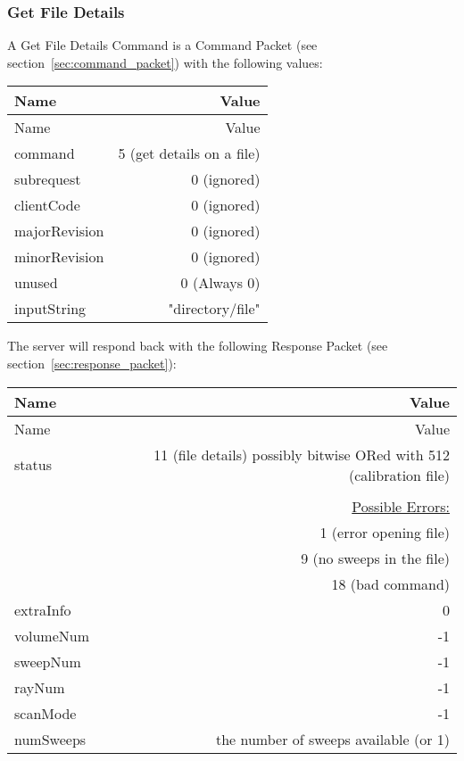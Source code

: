 \documentclass[10pt]{article}
\newcommand{\tblspc}{\rule{0pt}{3ex}}
\begin{document}
\subsubsection{Get File Details}
\label{sec:get_file_details}
A Get File Details Command is a Command Packet (see section~\ref{sec:command_packet}) with the following values:
\begin{longtable}{|l|r|}
\hline Name & Value \\ \hline \endfirsthead
\hline Name & Value \\ \hline \endhead
\hline \endfoot
\tblspc command & 5 (get details on a file) \\
\hline
\tblspc subrequest & 0 (ignored) \\
\hline
\tblspc clientCode & 0 (ignored) \\
\hline
\tblspc majorRevision & 0 (ignored) \\
\hline
\tblspc minorRevision & 0 (ignored) \\
\hline
\tblspc unused & 0 (Always 0) \\
\hline
\tblspc inputString & "directory/file" \\
\hline
\end{longtable}
\newpage

The server will respond back with the following Response Packet (see section~\ref{sec:response_packet}):
\begin{longtable}{|l|r|}
\hline Name & Value \\ \hline \endfirsthead
\hline Name & Value \\ \hline \endhead
\hline \endfoot
\tblspc status & 11 (file details) possibly bitwise ORed with 512 (calibration file) \\
& \\
& \underline{Possible Errors:} \\
& 1 (error opening file) \\
& 9 (no sweeps in the file) \\
& 18 (bad command) \\
\hline
\tblspc extraInfo & 0 \\
\hline
\tblspc volumeNum & -1 \\
\hline
\tblspc sweepNum & -1 \\
\hline
\tblspc rayNum & -1 \\
\hline
\tblspc scanMode & -1 \\
\hline
\tblspc numSweeps & the number of sweeps available (or 1) \\
\hline
\end{longtable}
\end{document}
